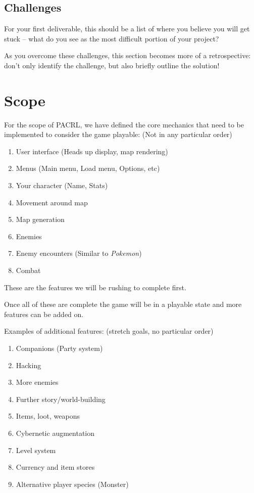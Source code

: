 \documentclass[10pt,conference,onecolumn,compsoc]{IEEEtran}
\begin{document}
\subsection{Challenges}
For your first deliverable, this should be a list of where you believe you will get stuck -- what do you see as the most difficult portion of your project?

As you overcome these challenges, this section becomes more of a retrospective: don't only identify the challenge, but also briefly outline the solution!


\pagebreak
\section{Scope}
For the scope of PACRL, we have defined the core mechanics that need to be implemented to consider the game playable: (Not in any particular order)
\begin{enumerate}
\item User interface (Heads up display, map rendering)
\item Menus (Main menu, Load menu, Options, etc)
\item Your character (Name, Stats)
\item Movement around map
\item Map generation
\item Enemies
\item Enemy encounters (Similar to \emph{Pokemon})
\item Combat
\end{enumerate}

These are the features we will be rushing to complete first. 

Once all of these are complete the game will be in a playable state and more features can be added on.

Examples of additional features: (stretch goals, no particular order)
\begin{enumerate}
\item Companions (Party system)
\item Hacking
\item More enemies
\item Further story/world-building
\item Items, loot, weapons
\item Cybernetic augmentation
\item Level system
\item Currency and item stores
\item Alternative player species (Monster)
\end{enumerate}
\end{document}
